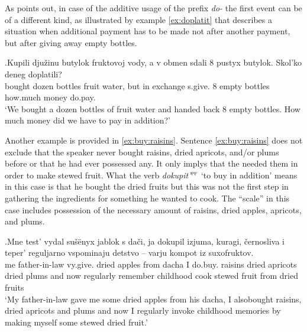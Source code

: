 As \citet[80]{Kagan:book} points out, in case of the additive usage of the prefix \textit{do-} the first event can be of a different kind, as illustrated by example \ref{ex:doplatit} that describes a situation when additional payment has to be made not after another payment, but after giving away empty bottles.

\exg.\label{ex:doplatit}Kupili dju\v{z}inu butylok fruktovoj vody, a v obmen sdali 8 pustyx butylok. Skol'ko deneg doplatili?\\
bought dozen bottles fruit water, but in exchange s.give. 8 empty bottles how.much money do.pay.\\
\trans `We bought a dozen bottles of fruit water and handed back 8 empty bottles. How much money did we have to pay in addition?'


Another example is provided in \ref{ex:buy:raisins}. Sentence \ref{ex:buy:raisins} does not exclude that the speaker never bought raisins, dried apricots, and/or plums before or that he had ever possessed any. It only implys that the needed them in order to make stewed fruit. What the verb \textit{dokupit'}$^{\textsc{pf}}$ `to buy in addition' means in this case is that he bought the dried fruits but this was not the first step in gathering the ingredients for something he wanted to cook. The ``scale'' in this case includes possession of the necessary amount of raisins, dried apples, apricots, and plums. 

\exg.\label{ex:buy:raisins}Mne test' vydal su\v{s}\"{e}nyx jablok s da\v{c}i, ja dokupil izjuma, kuragi, \v{c}ernosliva i teper' reguljarno vspominaju detstvo -- varju kompot iz suxofruktov.\\
me father-in-law vy.give. dried apples from dacha I do.buy. raisins {dried apricots} {dried plums} and now regularly remember childhood {} cook {stewed fruit} from {dried fruits}\\
\trans `My father-in-law gave me some dried apples from his dacha, I also\linebreak bought raisins, dried apricots and plums and now I regularly invoke childhood memories by making myself some stewed dried fruit.'\\

